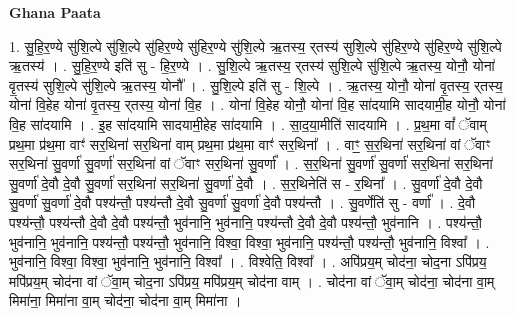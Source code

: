\documentclass[17pt]{extarticle}
\begin{document}
\textbf{Ghana Paata } \newline

1. सु॒हि॒र॒ण्ये सु॑शि॒ल्पे सु॑शि॒ल्पे सु॑हिर॒ण्ये सु॑हिर॒ण्ये सु॑शि॒ल्पे ऋ॒तस्य॒ र्‌तस्य॑ सुशि॒ल्पे सु॑हिर॒ण्ये सु॑हिर॒ण्ये सु॑शि॒ल्पे ऋ॒तस्य॑ । . सु॒हि॒र॒ण्ये इति॑ सु - हि॒र॒ण्ये । . सु॒शि॒ल्पे ऋ॒तस्य॒ र्‌तस्य॑ सुशि॒ल्पे सु॑शि॒ल्पे ऋ॒तस्य॒ योनौ॒ योना॑ वृ॒तस्य॑ सुशि॒ल्पे सु॑शि॒ल्पे ऋ॒तस्य॒ योनौ᳚ । . सु॒शि॒ल्पे इति॑ सु - शि॒ल्पे । . ऋ॒तस्य॒ योनौ॒ योना॑ वृ॒तस्य॒ र्‌तस्य॒ योना॑ वि॒हेह योना॑ वृ॒तस्य॒ र्‌तस्य॒ योना॑ वि॒ह । . योना॑ वि॒हेह योनौ॒ योना॑ वि॒ह सा॑दयामि सादयामी॒ह योनौ॒ योना॑ वि॒ह सा॑दयामि । . इ॒ह सा॑दयामि सादयामी॒हेह सा॑दयामि । . सा॒द॒या॒मीति॑ सादयामि । . प्र॒थ॒मा वां᳚ ॅवाम् प्रथ॒मा प्र॑थ॒मा वाꣳ॑ सर॒थिना॑ सर॒थिना॑ वाम् प्रथ॒मा प्र॑थ॒मा वाꣳ॑ सर॒थिना᳚ । . वाꣳ॒॒ स॒र॒थिना॑ सर॒थिना॑ वां ॅवाꣳ सर॒थिना॑ सु॒वर्णा॑ सु॒वर्णा॑ सर॒थिना॑ वां ॅवाꣳ सर॒थिना॑ सु॒वर्णा᳚ । . स॒र॒थिना॑ सु॒वर्णा॑ सु॒वर्णा॑ सर॒थिना॑ सर॒थिना॑ सु॒वर्णा॑ दे॒वौ दे॒वौ सु॒वर्णा॑ सर॒थिना॑ सर॒थिना॑ सु॒वर्णा॑ दे॒वौ । . स॒र॒थिनेति॑ स - र॒थिना᳚ । . सु॒वर्णा॑ दे॒वौ दे॒वौ सु॒वर्णा॑ सु॒वर्णा॑ दे॒वौ पश्य॑न्तौ॒ पश्य॑न्तौ दे॒वौ सु॒वर्णा॑ सु॒वर्णा॑ दे॒वौ पश्य॑न्तौ । . सु॒वर्णेति॑ सु - वर्णा᳚ । . दे॒वौ पश्य॑न्तौ॒ पश्य॑न्तौ दे॒वौ दे॒वौ पश्य॑न्तौ॒ भुव॑नानि॒ भुव॑नानि॒ पश्य॑न्तौ दे॒वौ दे॒वौ पश्य॑न्तौ॒ भुव॑नानि । . पश्य॑न्तौ॒ भुव॑नानि॒ भुव॑नानि॒ पश्य॑न्तौ॒ पश्य॑न्तौ॒ भुव॑नानि॒ विश्वा॒ विश्वा॒ भुव॑नानि॒ पश्य॑न्तौ॒ पश्य॑न्तौ॒ भुव॑नानि॒ विश्वा᳚ । . भुव॑नानि॒ विश्वा॒ विश्वा॒ भुव॑नानि॒ भुव॑नानि॒ विश्वा᳚ । . विश्वेति॒ विश्वा᳚ । . अपि॑प्रय॒म् चोद॑ना॒ चोद॒ना ऽपि॑प्रय॒ मपि॑प्रय॒म् चोद॑ना वां ॅवा॒म् चोद॒ना ऽपि॑प्रय॒ मपि॑प्रय॒म् चोद॑ना वाम् । . चोद॑ना वां ॅवा॒म् चोद॑ना॒ चोद॑ना वा॒म् मिमा॑ना॒ मिमा॑ना वा॒म् चोद॑ना॒ चोद॑ना वा॒म् मिमा॑ना । \newline
\end{document}
